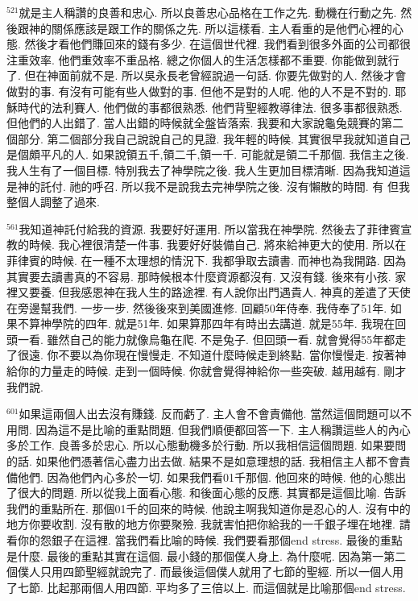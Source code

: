 \documentclass{book}
\begin{document}
$^{521}$就是主人稱讚的良善和忠心.
所以良善忠心品格在工作之先.
動機在行動之先.
然後跟神的關係應該是跟工作的關係之先.
所以這樣看.
主人看重的是他們心裡的心態.
然後才看他們賺回來的錢有多少.
在這個世代裡.
我們看到很多外面的公司都很注重效率.
他們重效率不重品格.
總之你個人的生活怎樣都不重要.
你能做到就行了.
但在神面前就不是.
所以吳永長老曾經說過一句話.
你要先做對的人.
然後才會做對的事.
有沒有可能有些人做對的事.
但他不是對的人呢.
他的人不是不對的.
耶穌時代的法利賽人.
他們做的事都很熟悉.
他們背聖經教導律法.
很多事都很熟悉.
但他們的人出錯了.
當人出錯的時候就全盤皆落索.
我要和大家說龜兔競賽的第二個部分.
第二個部分我自己說說自己的見證.
我年輕的時候.
其實很早我就知道自己是個頗平凡的人.
如果說領五千,領二千,領一千.
可能就是領二千那個.
我信主之後.
我人生有了一個目標.
特別我去了神學院之後.
我人生更加目標清晰.
因為我知道這是神的託付.
祂的呼召.
所以我不是說我去完神學院之後.
沒有懶散的時間.
有 但我整個人調整了過來.

$^{561}$我知道神託付給我的資源.
我要好好運用.
所以當我在神學院.
然後去了菲律賓宣教的時候.
我心裡很清楚一件事.
我要好好裝備自己.
將來給神更大的使用.
所以在菲律賓的時候.
在一種不太理想的情況下.
我都爭取去讀書.
而神也為我開路.
因為其實要去讀書真的不容易.
那時候根本什麼資源都沒有.
又沒有錢.
後來有小孩.
家裡又要養.
但我感恩神在我人生的路途裡.
有人說你出門遇貴人.
神真的差遣了天使在旁邊幫我們.
一步一步.
然後後來到美國進修.
回顧50年侍奉.
我侍奉了51年.
如果不算神學院的四年.
就是51年.
如果算那四年有時出去講道.
就是55年.
我現在回頭一看.
雖然自己的能力就像烏龜在爬.
不是兔子.
但回頭一看.
就會覺得55年都走了很遠.
你不要以為你現在慢慢走.
不知道什麼時候走到終點.
當你慢慢走.
按著神給你的力量走的時候.
走到一個時候.
你就會覺得神給你一些突破.
越用越有.
剛才我們說.

$^{601}$如果這兩個人出去沒有賺錢.
反而虧了.
主人會不會責備他.
當然這個問題可以不用問.
因為這不是比喻的重點問題.
但我們順便都回答一下.
主人稱讚這些人的內心多於工作.
良善多於忠心.
所以心態動機多於行動.
所以我相信這個問題.
如果要問的話.
如果他們憑著信心盡力出去做.
結果不是如意理想的話.
我相信主人都不會責備他們.
因為他們內心多於一切.
如果我們看01千那個.
他回來的時候.
他的心態出了很大的問題.
所以從我上面看心態.
和後面心態的反應.
其實都是這個比喻.
告訴我們的重點所在.
那個01千的回來的時候.
他說主啊我知道你是忍心的人.
沒有中的地方你要收割.
沒有散的地方你要聚殮.
我就害怕把你給我的一千銀子埋在地裡.
請看你的怨銀子在這裡.
當我們看比喻的時候.
我們要看那個end stress.
最後的重點是什麼.
最後的重點其實在這個.
最小錢的那個僕人身上.
為什麼呢.
因為第一第二個僕人只用四節聖經就說完了.
而最後這個僕人就用了七節的聖經.
所以一個人用了七節.
比起那兩個人用四節.
平均多了三倍以上.
而這個就是比喻那個end stress.
\end{document}
